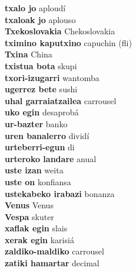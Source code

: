 \textbf{ txalo jo  } aploudí \\
\textbf{ txaloak jo  } aplouso \\
\textbf{ Txekoslovakia  } Chekoslovakia \\
\textbf{ tximino kaputxino  } capuchin (fli) \\
\textbf{ Txina  } China \\
\textbf{ txistua bota  } skupi \\
\textbf{ txori-izugarri  } wantomba \\
\textbf{ ugerrez bete  } sushi \\
\textbf{ uhal garraiatzailea  } carrousel \\
\textbf{ uko egin  } desaprobá \\
\textbf{ ur-bazter  } banko \\
\textbf{ uren banalerro  } dividí \\
\textbf{ urteberri-egun  } di \\
\textbf{ urteroko landare  } anual \\
\textbf{ uste izan  } weita \\
\textbf{ uste on  } konfiansa \\
\textbf{ ustekabeko irabazi  } bonanza \\
\textbf{ Venus  } Venus \\
\textbf{ Vespa  } skuter \\
\textbf{ xaflak egin  } slais \\
\textbf{ xerak egin  } karisiá \\
\textbf{ zaldiko-maldiko  } carrousel \\
\textbf{ zatiki hamartar  } decimal \\
